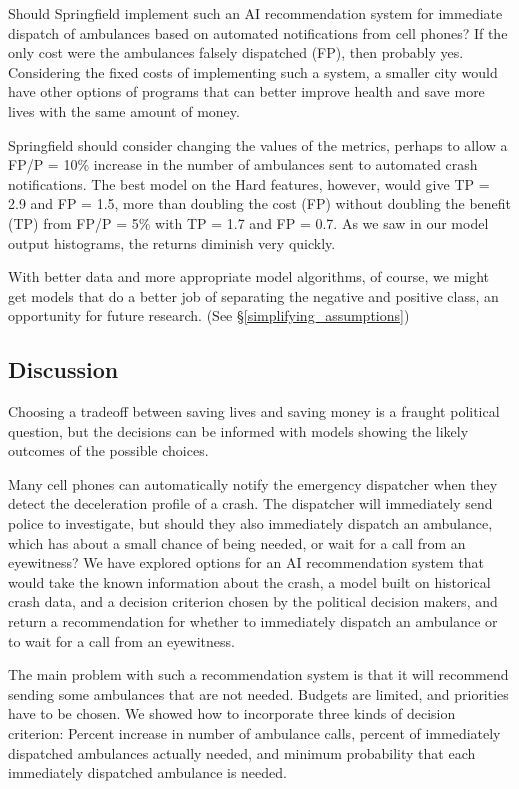 \FloatBarrier

Should Springfield implement such an AI recommendation system for immediate dispatch of ambulances based on automated notifications from cell phones?  If the only cost were the ambulances falsely dispatched (FP), then probably yes.  Considering the fixed costs of implementing such a system, a smaller city would have other options of programs that can better improve health and save more lives with the same amount of money.  

Springfield should consider changing the values of the metrics, perhaps to allow a FP/P = 10\% increase in the number of ambulances sent to automated crash notifications.  The best model on the Hard features, however, would give TP = 2.9 and FP = 1.5, more than doubling the cost (FP) without doubling the benefit (TP) from FP/P = 5\% with TP = 1.7 and FP = 0.7.  As we saw in our model output histograms, the returns diminish very quickly.  

With better data and more appropriate model algorithms, of course, we might get models that do a better job of separating the negative and positive class, an opportunity for future research.  (See \S \ref{simplifying_assumptions})

\subsection{Discussion}

Choosing a tradeoff between saving lives and saving money is a fraught political question, but the decisions can be informed with models showing the likely outcomes of the possible choices.  

Many cell phones can automatically notify the emergency dispatcher when they detect the deceleration profile of a crash.  The dispatcher will immediately send police to investigate, but should they also immediately dispatch an ambulance, which has about a small chance of being needed, or wait for a call from an eyewitness?  We have explored options for an AI recommendation system that would take the known information about the crash, a model built on historical crash data, and a decision criterion chosen by the political decision makers, and return a recommendation for whether to immediately dispatch an ambulance or to wait for a call from an eyewitness.

The main problem with such a recommendation system is that it will recommend sending some ambulances that are not needed.  Budgets are limited, and priorities have to be chosen.  We showed how to incorporate three kinds of decision criterion:  Percent increase in number of ambulance calls, percent of immediately dispatched ambulances actually needed, and minimum probability that each immediately dispatched ambulance is needed.  

